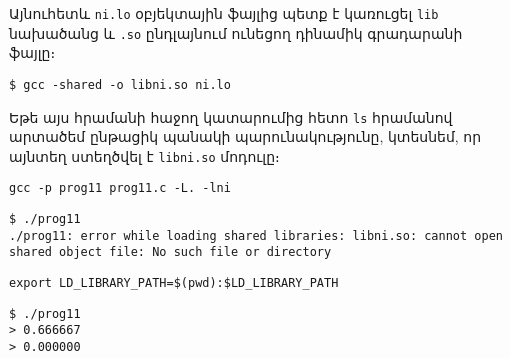 Այնուհետև \texttt{ni.lo} օբյեկտային ֆայլից պետք է կառուցել
\texttt{lib} նախածանց և \texttt{.so} ընդլայնում ունեցող դինամիկ
գրադարանի ֆայլը։

\begin{Verbatim}
$ gcc -shared -o libni.so ni.lo
\end{Verbatim}

Եթե այս հրամանի հաջող կատարումից հետո \texttt{ls} հրամանով արտածեմ
ընթացիկ պանակի պարունակությունը, կտեսնեմ, որ այնտեղ ստեղծվել է
\texttt{libni.so} մոդուլը։

\begin{Verbatim}
gcc -p prog11 prog11.c -L. -lni
\end{Verbatim}

\begin{Verbatim}
$ ./prog11
./prog11: error while loading shared libraries: libni.so: cannot open shared object file: No such file or directory
\end{Verbatim}

\begin{Verbatim}
export LD_LIBRARY_PATH=$(pwd):$LD_LIBRARY_PATH
\end{Verbatim}

\begin{Verbatim}
$ ./prog11
> 0.666667
> 0.000000
\end{Verbatim}
